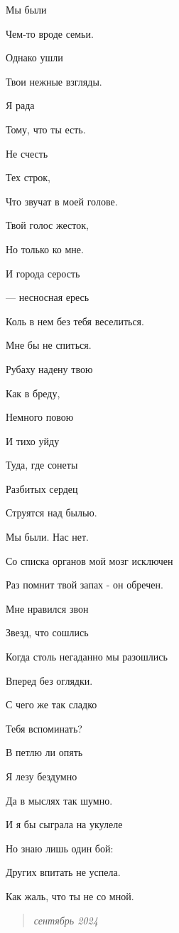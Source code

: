 \documentclass[
  a5paperpaper,
  DIV=11,
  numbers=noendperiod]{scrreprt}
\begin{document}
Мы были

Чем-то вроде семьи.

Однако ушли

Твои нежные взгляды.

Я рада

Тому, что ты есть.

Не счесть

Тех строк,

Что звучат в моей голове.

Твой голос жесток,

Но только ко мне.

И города серость

--- несносная ересь

Коль в нем без тебя веселиться.

Мне бы не спиться.

Рубаху надену твою

Как в бреду,

Немного повою

И тихо уйду

Туда, где сонеты

Разбитых сердец

Струятся над былью.

Мы были. Нас нет.

Со списка органов мой мозг исключен

Раз помнит твой запах - он обречен.

Мне нравился звон

Звезд, что сошлись

Когда столь негаданно мы разошлись

Вперед без оглядки.

С чего же так сладко

Тебя вспоминать?

В петлю ли опять

Я лезу бездумно

Да в мыслях так шумно.

И я бы сыграла на укулеле

Но знаю лишь один бой:

Других впитать не успела.

Как жаль, что ты не со мной.

\begin{quote}
\emph{сентябрь 2024}
\end{quote}
\end{document}
